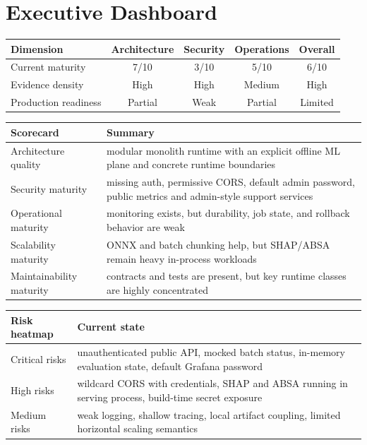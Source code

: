 \tableofcontents
\newpage

\section*{Executive Dashboard}
\begin{table}[H]
\centering
\begin{tabularx}{\textwidth}{@{}l c c c c@{}}
\toprule
\textbf{Dimension} & \textbf{Architecture} & \textbf{Security} & \textbf{Operations} & \textbf{Overall} \\
\midrule
Current maturity & 7/10 & 3/10 & 5/10 & 6/10 \\
Evidence density & High & High & Medium & High \\
Production readiness & Partial & Weak & Partial & Limited \\
\bottomrule
\end{tabularx}
\end{table}

\begin{table}[H]
\centering
\begin{tabularx}{\textwidth}{@{}lX@{}}
\toprule
\textbf{Scorecard} & \textbf{Summary} \\
\midrule
Architecture quality & modular monolith runtime with an explicit offline ML plane and concrete runtime boundaries \\
Security maturity & missing auth, permissive CORS, default admin password, public metrics and admin-style support services \\
Operational maturity & monitoring exists, but durability, job state, and rollback behavior are weak \\
Scalability maturity & ONNX and batch chunking help, but SHAP/ABSA remain heavy in-process workloads \\
Maintainability maturity & contracts and tests are present, but key runtime classes are highly concentrated \\
\bottomrule
\end{tabularx}
\end{table}

\begin{table}[H]
\centering
\begin{tabularx}{\textwidth}{@{}lX@{}}
\toprule
\textbf{Risk heatmap} & \textbf{Current state} \\
\midrule
Critical risks & unauthenticated public API, mocked batch status, in-memory evaluation state, default Grafana password \\
High risks & wildcard CORS with credentials, SHAP and ABSA running in serving process, build-time secret exposure \\
Medium risks & weak logging, shallow tracing, local artifact coupling, limited horizontal scaling semantics \\
\bottomrule
\end{tabularx}
\end{table}

